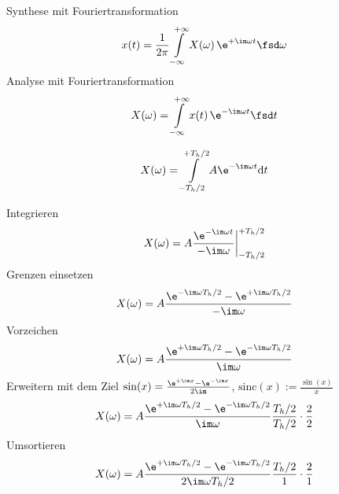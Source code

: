 \begin{Werkzeug}
Synthese mit Fouriertransformation
\begin{align}
x(t) = \frac{1}{2\pi} \int\limits_{-\infty}^{+\infty} X(\omega) \, \e^{+\im \omega t} \fsd \omega
\end{align}
%
Analyse mit Fouriertransformation
\begin{align}
X(\omega) = \int\limits_{-\infty}^{+\infty} x(t) \, \e^{-\im \omega t} \fsd t
\end{align}
\end{Werkzeug}

\begin{Ansatz}
\begin{equation}
X(\omega) = \int\limits_{-T_h/2}^{+T_h/2} A \e^{-\im \omega t} \mathrm{d}t
\end{equation}
\end{Ansatz}

\begin{ExCalc}
Integrieren
\begin{equation}
X(\omega) = A \frac{\e^{-\im \omega t}}{-\im \omega} \bigg|_{-T_h/2}^{+T_h/2}
\end{equation}
Grenzen einsetzen
\begin{equation}
X(\omega) = A \frac{\e^{-\im \omega T_h/2}-\e^{+\im \omega T_h/2}}{-\im \omega}
\end{equation}
Vorzeichen
\begin{equation}
X(\omega) = A \frac{\e^{+\im \omega T_h/2}-\e^{-\im \omega T_h/2}}{\im \omega}
\end{equation}
Erweitern mit dem Ziel $\sin(x) = \frac{\e^{+\im x}-\e^{-\im x}}{2\im}$, $\mathrm{sinc}(x):=\frac{\sin(x)}{x}$
\begin{equation}
X(\omega) = A \frac{\e^{+\im \omega T_h/2}-\e^{-\im \omega T_h/2}}{\im \omega} \frac{T_h/2}{T_h/2} \cdot \frac{2}{2}
\end{equation}
Umsortieren
\begin{equation}
X(\omega) = A \frac{\e^{+\im \omega T_h/2}-\e^{-\im \omega T_h/2}}{2 \im \omega T_h/2} \frac{T_h/2}{1} \cdot \frac{2}{1}
\end{equation}
\end{ExCalc}

